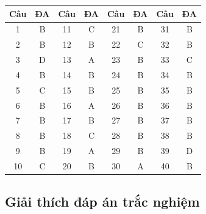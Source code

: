\documentclass[10pt]{article}
\begin{document}
\begin{singlespace}
\begin{longtable}{|c|c||c|c||c|c||c|c|}
\hline
\textbf{Câu} & \textbf{ĐA} & \textbf{Câu} & \textbf{ĐA} & \textbf{Câu} & \textbf{ĐA} & \textbf{Câu} & \textbf{ĐA} \\
\hline
\endhead
1 & B & 11 & C & 21 & B & 31 & B \\
\hline
2 & B & 12 & B & 22 & C & 32 & B \\
\hline
3 & D & 13 & A & 23 & B & 33 & C \\
\hline
4 & B & 14 & B & 24 & B & 34 & B \\
\hline
5 & C & 15 & B & 25 & B & 35 & B \\
\hline
6 & B & 16 & A & 26 & B & 36 & B \\
\hline
7 & B & 17 & B & 27 & B & 37 & B \\
\hline
8 & B & 18 & C & 28 & B & 38 & B \\
\hline
9 & B & 19 & A & 29 & B & 39 & D \\
\hline
10 & C & 20 & B & 30 & A & 40 & B \\
\hline
\end{longtable}
\end{singlespace}

\subsection*{Giải thích đáp án trắc nghiệm}
\end{document}
